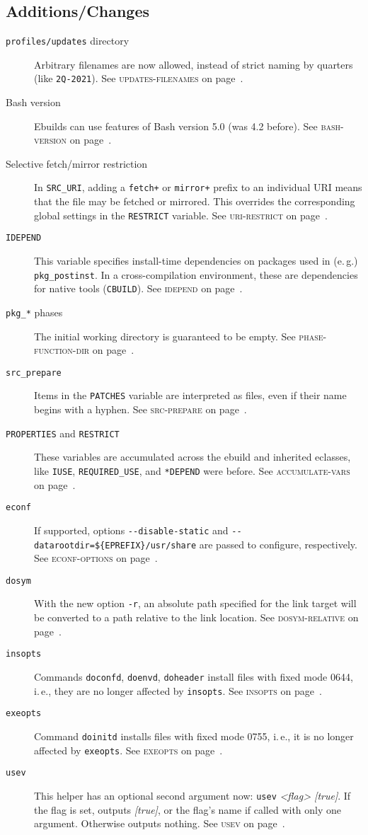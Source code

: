 \documentclass[a4paper,nofoldmark]{leaflet}
\newcommand{\code}[1]{\texttt{#1}}
\newcommand{\featureref}[1]{\textsc{#1} on page~\pageref{feat:#1}}
\begin{document}
\subsection{Additions/Changes}
\label{sec:cs:eapi8-additions}
\begin{description}
    \item[\code{profiles/updates} directory] Arbitrary filenames
    are now allowed, instead of strict naming by quarters
    (like \code{2Q-2021}). See \featureref{updates-filenames}.
    \item[Bash version] Ebuilds can use features of Bash version 5.0
    (was 4.2 before). See \featureref{bash-version}.
    \item[Selective fetch/mirror restriction] In \code{SRC_URI},
    adding a \code{fetch+} or \code{mirror+} prefix to an individual
    URI means that the file may be fetched or mirrored. This overrides
    the corresponding global settings in the \code{RESTRICT} variable.
    See \featureref{uri-restrict}.
    \item[\code{IDEPEND}] This variable specifies install-time
    dependencies on packages used in (e.\,g.) \code{pkg_postinst}.
    In a cross-compilation environment, these are dependencies for
    native tools (\code{CBUILD}). See \featureref{idepend}.
    \item[\code{pkg_*} phases] The initial working directory is
    guaranteed to be empty. See \featureref{phase-function-dir}.
    \item[\code{src_prepare}] Items in the \code{PATCHES} variable are
    interpreted as files, even if their name begins with a hyphen.
    See \featureref{src-prepare}.
    \item[\code{PROPERTIES} and \code{RESTRICT}] These variables are
    accumulated across the ebuild and inherited eclasses, like
    \code{IUSE}, \code{REQUIRED\_USE}, and \code{*DEPEND} were before.
    See \featureref{accumulate-vars}.
    \item[\code{econf}] If supported, options
    \code{-{}-disable-static} and
    \code{-{}-datarootdir=\$\{EPREFIX\}/usr/share} are passed
    to configure, respectively. See \featureref{econf-options}.
    \item[\code{dosym}] With the new option \code{-r}, an absolute
    path specified for the link target will be converted to a path
    relative to the link location. See \featureref{dosym-relative}. 
    \item[\code{insopts}] Commands \code{doconfd}, \code{doenvd},
    \code{doheader} install files with fixed mode 0644, i.\,e.,
    they are no longer affected by \code{insopts}.
    See \featureref{insopts}.
    \item[\code{exeopts}] Command \code{doinitd} installs files
    with fixed mode 0755, i.\,e., it is no longer affected by
    \code{exeopts}. See \featureref{exeopts}.
    \item[\code{usev}] This helper has an optional second argument
    now: \code{usev} \emph{<flag> [true]}. If the flag is set,
    outputs \emph{[true]}, or the flag's name if called with only one
    argument. Otherwise outputs nothing. See \featureref{usev}.
\end{description}
\end{document}
